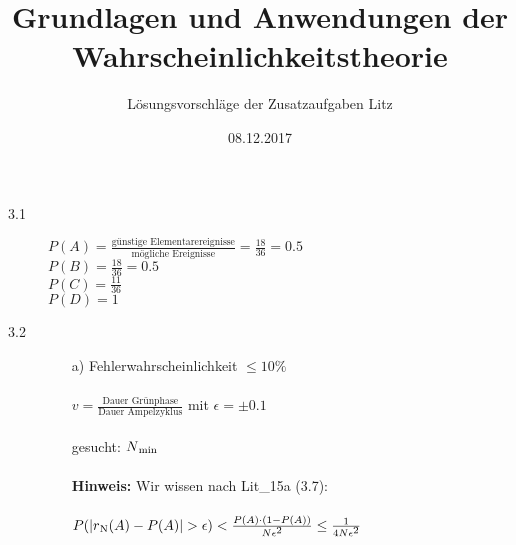 \documentclass[a4paper]{article}
\begin{document}
\chead{}


\title{\LARGE Grundlagen und Anwendungen der Wahrscheinlichkeitstheorie} 
\author{\Large Lösungsvorschläge der Zusatzaufgaben Litz}
\date{08.12.2017}
\maketitle


\begin{description}

\item[3.1]
				
         $P(A)= \frac{\text{günstige Elementarereignisse}}{\text{mögliche Ereignisse}}= \frac{18}{36				}= 0.5$\\
         $P(B)= \frac{18}{36}= 0.5$\\
         $P(C)= \frac{11}{36}$\\
         $P(D)= 1$\\


\item[3.2] 
\begin{itemize}
	\item[a)] Fehlerwahrscheinlichkeit $\leq 10\%$\\
		\\
		$v=\frac{\text{Dauer Grünphase}}{\text{Dauer Ampelzyklus}}$ mit $\epsilon= \pm 0.1$\\
		\\
		gesucht: $N\textsubscript{min}$\\
		\\
		\textbf{Hinweis:} Wir wissen nach Lit\_15a (3.7):\\
		\\
		$P(\left|r\textsubscript{N}(A)-P(A)\right|>\epsilon) < \frac{P(A)\cdot(1-P(A))}{N\epsilon\textsuperscript{2}} \leq \frac{1}{4N\epsilon\textsuperscript{2}}$\\
		

\end{itemize}
\end{description}
\end{document}
